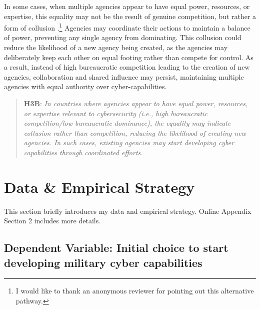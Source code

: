 \documentclass[12pt, letterpaper]{article}
\renewcommand{\baselinestretch}{1.35}
\let\oldfootnote\footnote
\renewcommand\footnote[1]{\oldfootnote{%
		\renewcommand\baselinestretch{.8}%
		\large\footnotesize\ignorespaces#1}} \addtolength{\footnotesep}{3pt}
\theoremstyle{plain}
\theoremstyle{remark}
\begin{document}
In some cases, when multiple agencies appear to have equal power, resources, or expertise, this equality may not be the result of genuine competition, but rather a form of collusion \citep{cote1996politics}.\footnote{I would like to thank an anonymous reviewer for pointing out this alternative pathway.} Agencies may coordinate their actions to maintain a balance of power, preventing any single agency from dominating. This collusion could reduce the likelihood of a new agency being created, as the agencies may deliberately keep each other on equal footing rather than compete for control. As a result, instead of high bureaucratic competition leading to the creation of new agencies, collaboration and shared influence may persist, maintaining multiple agencies with equal authority over cyber-capabilities.

\begin{quote}
	\textbf{H3B}: 
	\textit{In countries where agencies appear to have equal power, resources, or expertise relevant to cybersecurity (i.e., high bureaucratic competition/low bureaucratic dominance), the equality may indicate collusion rather than competition, reducing the likelihood of creating new agencies. In such cases, existing agencies may start developing cyber capabilities through coordinated efforts.}
\end{quote}    



\vspace{3mm}



\section*{Data \& Empirical Strategy}\label{sec:data}

\noindent
This section briefly introduces my data and empirical strategy. Online Appendix Section 2 includes more details. 
\vspace{3mm}

\subsection*{Dependent Variable: Initial choice to start developing military cyber capabilities}
\end{document}
